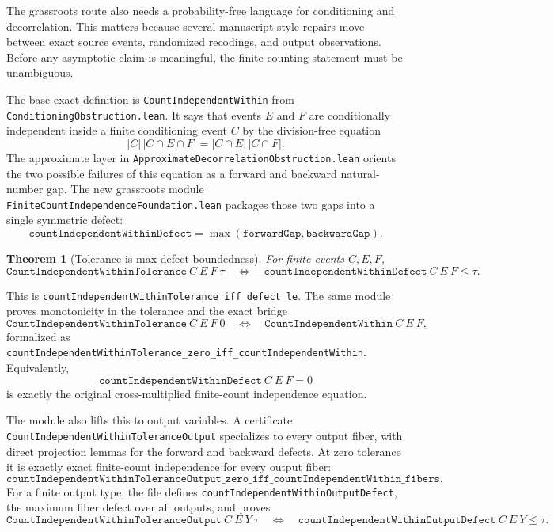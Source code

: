 \documentclass[11pt]{article}
\newtheorem{theorem}{Theorem}[section]
\theoremstyle{remark}
\begin{document}
The grassroots route also needs a probability-free language for conditioning and
decorrelation.  This matters because several manuscript-style repairs move
between exact source events, randomized recodings, and output observations.
Before any asymptotic claim is meaningful, the finite counting statement must be
unambiguous.

The base exact definition is \texttt{CountIndependentWithin} from
\texttt{ConditioningObstruction.lean}.  It says that events \(E\) and \(F\) are
conditionally independent inside a finite conditioning event \(C\) by the
division-free equation
\[
  |C|\,|C\cap E\cap F| = |C\cap E|\,|C\cap F|.
\]
The approximate layer in \texttt{ApproximateDecorrelationObstruction.lean}
orients the two possible failures of this equation as a forward and backward
natural-number gap.  The new grassroots module
\texttt{FiniteCountIndependenceFoundation.lean} packages those two gaps into a
single symmetric defect:
\[
  \texttt{countIndependentWithinDefect}
  = \max(\texttt{forwardGap},\texttt{backwardGap}).
\]

\begin{theorem}[Tolerance is max-defect boundedness]
For finite events \(C,E,F\),
\[
  \texttt{CountIndependentWithinTolerance}\ C\ E\ F\ \tau
  \quad\Longleftrightarrow\quad
  \texttt{countIndependentWithinDefect}\ C\ E\ F \le \tau.
\]
\end{theorem}

\noindent
This is \texttt{countIndependentWithinTolerance\_iff\_defect\_le}.  The same
module proves monotonicity in the tolerance and the exact bridge
\[
  \texttt{CountIndependentWithinTolerance}\ C\ E\ F\ 0
  \quad\Longleftrightarrow\quad
  \texttt{CountIndependentWithin}\ C\ E\ F,
\]
formalized as
\texttt{countIndependentWithinTolerance\_zero\_iff\_countIndependentWithin}.
Equivalently,
\[
  \texttt{countIndependentWithinDefect}\ C\ E\ F = 0
\]
is exactly the original cross-multiplied finite-count independence equation.

The module also lifts this to output variables.  A certificate
\texttt{CountIndependentWithinToleranceOutput} specializes to every output
fiber, with direct projection lemmas for the forward and backward defects.  At
zero tolerance it is exactly exact finite-count independence for every output
fiber:
\[
  \texttt{countIndependentWithinToleranceOutput\_zero\_iff\_countIndependentWithin\_fibers}.
\]
For a finite output type, the file defines
\texttt{countIndependentWithinOutputDefect}, the maximum fiber defect over all
outputs, and proves
\[
  \texttt{CountIndependentWithinToleranceOutput}\ C\ E\ Y\ \tau
  \quad\Longleftrightarrow\quad
  \texttt{countIndependentWithinOutputDefect}\ C\ E\ Y \le \tau.
\]
\end{document}
